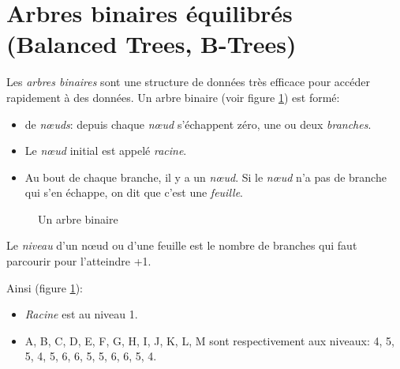 \section{Arbres binaires équilibrés (Balanced Trees, B-Trees)}\label{btree}
Les \emph{arbres binaires} sont une structure de données très efficace
pour accéder rapidement à des données. Un arbre binaire (voir figure
\ref{bt1})  est formé:
\begin{itemize}

\item de \emph{n{\oe}uds}: depuis chaque \emph{n{\oe}ud} s'échappent zéro,
  une ou deux \emph{branches}.
\item Le \emph{n{\oe}ud} initial est appelé \emph{racine}.
\item Au bout de chaque branche, il y a un \emph{n{\oe}ud}. Si le
  \emph{n{\oe}ud} n'a pas de branche qui s'en échappe, on dit que
  c'est une \emph{feuille}.
\end{itemize}

\begin{center}
\begin{figure}
\caption{Un arbre binaire}\label{bt1}
\end{figure}
\end{center}

 Le \emph{niveau} d'un n{\oe}ud ou d'une feuille est le nombre de branches
 qui faut parcourir pour l'atteindre +1.

 Ainsi (figure \ref{bt1}):
 \begin{itemize}
 \item \emph{Racine} est au niveau 1.
 \item A, B, C, D, E, F, G,  H, I, J, K, L, M sont respectivement aux niveaux:
   4, 5, 5, 4, 5, 6, 6,  5, 5, 6, 6, 5, 4.
 \end{itemize}
   
